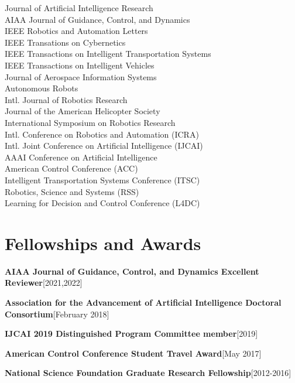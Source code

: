 \documentclass[10pt,roman]{moderncv}
\newcommand{\mycvitem}[2]{
    \textbf{#2}\hfill [#1]\break
}
\begin{document}
\vspace{-2ex}
\begin{multicols}{2}
\small
Journal of Artificial Intelligence Research\\
AIAA Journal of Guidance, Control, and Dynamics\\
IEEE Robotics and Automation Letters\\
IEEE Transations on Cybernetics\\
IEEE Transactions on Intelligent Transportation Systems\\
IEEE Transactions on Intelligent Vehicles\\
Journal of Aerospace Information Systems\\
Autonomous Robots\\
Intl. Journal of Robotics Research\\
Journal of the American Helicopter Society\\
International Symposium on Robotics Research\\
Intl. Conference on Robotics and Automation (ICRA)\\
Intl. Joint Conference on Artificial Intelligence (IJCAI)\\
AAAI Conference on Artificial Intelligence\\
American Control Conference (ACC)\\
Intelligent Transportation Systems Conference (ITSC)\\
Robotics, Science and Systems (RSS)\\
Learning for Decision and Control Conference (L4DC)\\
\end{multicols}

\section{Fellowships and Awards}

\mycvitem{2021,2022}{AIAA Journal of Guidance, Control, and Dynamics Excellent Reviewer}
\mycvitem{February 2018}{Association for the Advancement of Artificial Intelligence Doctoral Consortium}
\mycvitem{2019}{IJCAI 2019 Distinguished Program Committee member}
\mycvitem{May 2017}{American Control Conference Student Travel Award}
\mycvitem{2012-2016}{National Science Foundation Graduate Research Fellowship}
\end{document}
